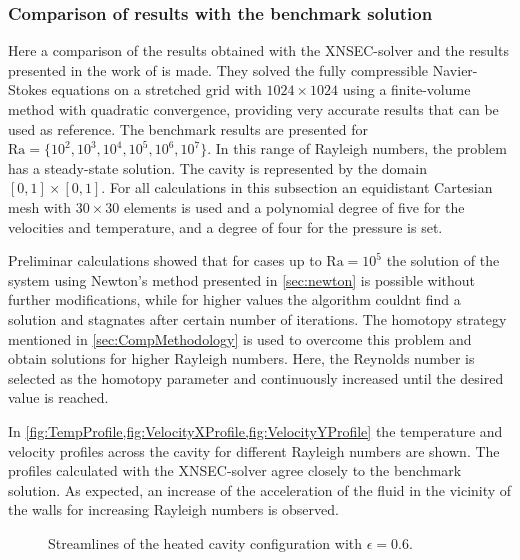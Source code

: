 \subsubsection{Comparison of results with the benchmark solution}

Here a comparison of the results obtained with the XNSEC-solver and the results presented in the work of \cite{vierendeelsBenchmarkSolutionsNatural2003} is made. They solved the fully compressible Navier-Stokes equations on a stretched grid with $1024\times1024$ using a finite-volume method with quadratic convergence, providing very accurate results that can be used as reference.
The benchmark results are presented for $\text{Ra} = \{10^2,10^3,10^4,10^5,10^6,10^7\}$. In this range of Rayleigh numbers, the problem has a steady-state solution. 
The cavity is represented by the domain $[0,1]\times[0,1]$. For all calculations in this subsection an equidistant Cartesian mesh with $30 \times 30$ elements is used and a polynomial degree of five for the velocities and temperature, and a degree of four for the pressure is set.
%


Preliminar calculations showed that for cases up to $\text{Ra} = 10^5$ the solution of the system using Newton's method presented in \cref{sec:newton} is possible without further modifications, while for higher values the algorithm couldnt find a solution and stagnates after certain number of iterations. The homotopy strategy mentioned in \cref{sec:CompMethodology} is used to overcome this problem and obtain solutions for higher Rayleigh numbers. Here, the Reynolds number is selected as the homotopy parameter and continuously increased until the desired value is reached.

In \cref{fig:TempProfile,fig:VelocityXProfile,fig:VelocityYProfile} the temperature and velocity profiles across the cavity for different Rayleigh numbers are shown. The profiles calculated with the XNSEC-solver agree closely to the benchmark solution. As expected, an increase of the acceleration of the fluid in the vicinity of the walls for increasing Rayleigh numbers is observed.
\begin{figure}[h]
	\centering
	\pgfplotsset{width=0.3 \textwidth, compat=1.3}
	\caption{Streamlines of the heated cavity configuration with $\epsilon = 0.6$.}\label{fig:HSCStreamlines}
\end{figure}


